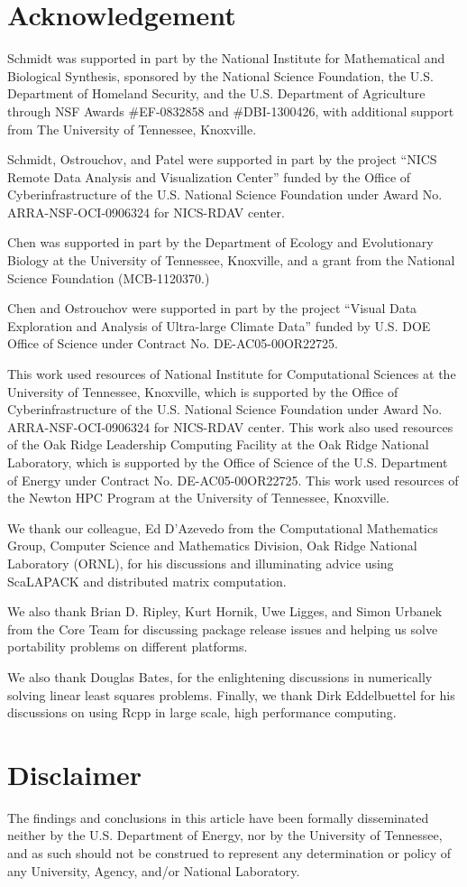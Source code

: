 \section*{Acknowledgement}

Schmidt was supported in part by the National 
Institute for Mathematical and Biological Synthesis, 
sponsored by the National Science Foundation, the 
U.S. Department of Homeland Security, and the U.S. 
Department of Agriculture through NSF Awards 
\#EF-0832858 and \#DBI-1300426, with additional 
support from The University of Tennessee, Knoxville. 

Schmidt, Ostrouchov, and Patel 
were supported in part by the project
``NICS Remote Data Analysis and Visualization Center''
funded by the Office of Cyberinfrastructure of the
U.S. National Science Foundation
under Award No. ARRA-NSF-OCI-0906324 for NICS-RDAV center.

Chen was supported in part by
the Department of Ecology and Evolutionary Biology at the
University of Tennessee, Knoxville, and a grant from
the National Science Foundation (MCB-1120370.)

Chen and Ostrouchov were supported in part by the project
``Visual Data Exploration and Analysis of Ultra-large Climate Data''
funded by U.S. DOE Office of Science
under Contract No. DE-AC05-00OR22725.

This work used resources of National Institute for Computational
Sciences at the University of Tennessee, Knoxville, which is supported
by the Office of Cyberinfrastructure of the U.S. National Science Foundation
under Award No. ARRA-NSF-OCI-0906324 for NICS-RDAV center.
This work also used resources of the Oak Ridge Leadership Computing Facility
at the Oak Ridge National Laboratory, which is supported by the Office of
Science of the U.S. Department of Energy under Contract No. DE-AC05-00OR22725.
This work used resources of the Newton HPC Program at the University of
Tennessee, Knoxville. 

We thank our colleague, Ed D'Azevedo
from the Computational Mathematics Group,
Computer Science and Mathematics Division,
Oak Ridge National Laboratory (ORNL),
for his discussions and illuminating advice using 
ScaLAPACK and distributed matrix computation.

We also thank Brian D. Ripley, Kurt Hornik, Uwe Ligges, and Simon Urbanek
from the  Core Team for discussing package release issues and
helping us solve portability problems on different platforms.

We also thank Douglas Bates, for the enlightening discussions in numerically solving linear least squares problems.  Finally, we thank Dirk Eddelbuettel for his discussions on using Rcpp in large scale, high performance computing.


\section*{Disclaimer}
The findings and conclusions in this article have been formally disseminated
neither by the U.S. Department of Energy, nor by the University of Tennessee,
and as such should not be construed to represent any determination or policy of
any University, Agency, and/or National Laboratory.
